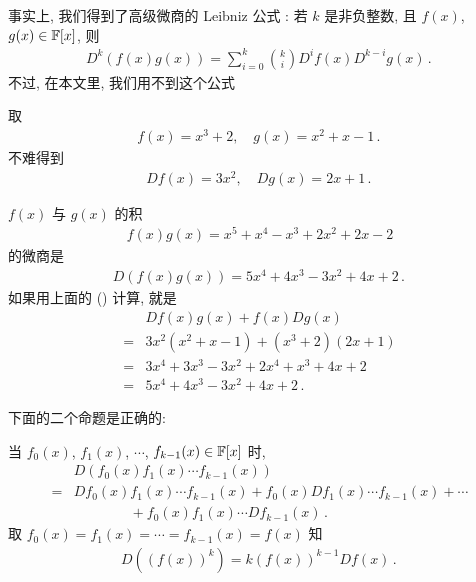 \begin{remark}
    事实上, 我们得到了高级微商的 Leibniz 公式 : 若 $k$ 是非负整数, 且 $f(x)$, $g(x) \in \mathbb{F}[x]$, 则
    \begin{align*}
        D^k (f(x)g(x)) = \sum_{i = 0}^{k} \binom{k}{i} D^i f(x) D^{k-i} g(x) \period
    \end{align*}
    不过, 在本文里, 我们用不到这个公式\period
\end{remark}

\begin{example}
    取
    \begin{align*}
        f(x) = x^3 + 2, \quad g(x) = x^2 + x - 1 \period
    \end{align*}
    不难得到
    \begin{align*}
        Df (x) = 3x^2, \quad Dg (x) = 2x + 1 \period
    \end{align*}

    $f(x)$ 与 $g(x)$ 的积
    \begin{align*}
        f(x) g(x) = x^5 + x^4 - x^3 + 2x^2 + 2x - 2
    \end{align*}
    的微商是
    \begin{align*}
        D(f(x) g(x)) = 5x^4 + 4x^3 - 3x^2 + 4x + 2 \period
    \end{align*}
    如果用上面的 (\myStar) 计算, 就是
    \begin{align*}
             & Df (x) g(x) + f(x) Dg (x)                \\
        = {} & 3x^2 (x^2 + x - 1) + (x^3 + 2) (2x + 1)  \\
        = {} & 3x^4 + 3x^3 - 3x^2 + 2x^4 + x^3 + 4x + 2 \\
        = {} & 5x^4 + 4x^3 - 3x^2 + 4x + 2 \period
    \end{align*}
\end{example}

下面的二个命题是正确的:

\begin{proposition}
    当 $f_0 (x)$, $f_1 (x)$, $\cdots$, $f_{k-1} (x) \in \mathbb{F}[x]$ 时,
    \begin{align*}
             & D(f_0 (x) f_1 (x) \cdots f_{k-1} (x))                                              \\
        = {} & Df_0 (x) f_1 (x) \cdots f_{k-1} (x) + f_0 (x) Df_1 (x) \cdots f_{k-1} (x) + \cdots \\
             & \qquad \qquad + f_0 (x) f_1 (x) \cdots Df_{k-1} (x) \period
    \end{align*}
    取 $f_0 (x) = f_1 (x) = \cdots = f_{k-1} (x) = f(x)$ 知
    \begin{align*}
        D((f(x))^k) = k(f(x))^{k-1} Df(x) \period
    \end{align*}
\end{proposition}

